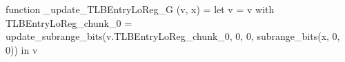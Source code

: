 function _update_TLBEntryLoReg_G (v, x) = let v = { v with TLBEntryLoReg_chunk_0 = update_subrange_bits(v.TLBEntryLoReg_chunk_0, 0, 0, subrange_bits(x, 0, 0)) } in
  v
